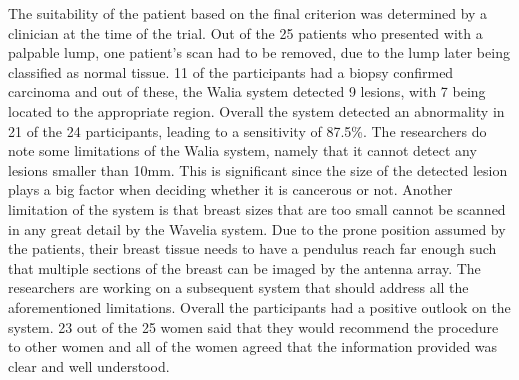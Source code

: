 The suitability of the patient based on the final criterion was determined by a clinician at the time of the trial. Out
of the 25 patients who presented with a palpable lump, one patient's scan had to be removed, due to the lump later being
classified as normal tissue. 11 of the participants had a biopsy confirmed carcinoma and out of these, the Walia system detected 9 lesions, with 7
being located to the appropriate region. Overall the system detected an abnormality in 21 of the 24 participants,
leading to a sensitivity of 87.5\%. The researchers do note some limitations of the Walia system, namely that it cannot
detect any lesions smaller than 10mm. This is significant since the size of the detected lesion plays a big factor when
deciding whether it is cancerous or not. Another limitation of the system is that breast sizes that are too small cannot
be scanned in any great detail by the Wavelia system. Due to the prone position assumed by the patients, their breast
tissue needs to have a pendulus reach far enough such that multiple sections of the breast can be imaged by the antenna
array. The researchers are working on a subsequent system that should address all the aforementioned limitations.
Overall the participants had a positive outlook on the system. 23 out of the 25 women said that they would recommend the
procedure to other women and all of the women agreed that the information provided was clear and well understood.

